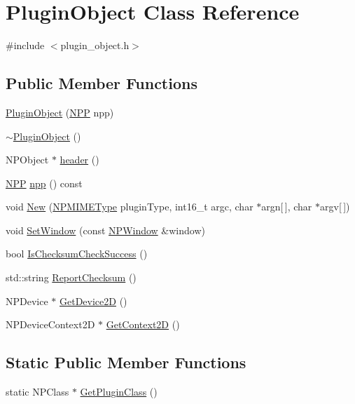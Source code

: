 \hypertarget{class_plugin_object}{
\section{PluginObject Class Reference}
\label{class_plugin_object}
}


{\ttfamily \#include $<$plugin\_\-object.h$>$}

\subsection*{Public Member Functions}
\begin{DoxyCompactItemize}
\item 
\hyperlink{class_plugin_object_ab24118f5b174beacb1b7f652bbbcf78d}{PluginObject} (\hyperlink{struct___n_p_p}{NPP} npp)
\item 
\hyperlink{class_plugin_object_ab2a72410c84a20133db4dec8ca92b277}{$\sim$PluginObject} ()
\item 
NPObject $\ast$ \hyperlink{class_plugin_object_ac551056ed0941b76c4161ba71e4cf449}{header} ()
\item 
\hyperlink{struct___n_p_p}{NPP} \hyperlink{class_plugin_object_a1a051ee92618bae8134b4d273d1d9982}{npp} () const 
\item 
void \hyperlink{class_plugin_object_a5e103c3aefcd2afb642c2414b92311ac}{New} (\hyperlink{npapi_8h_a6ab16d9f607aeb576061783638ae2973}{NPMIMEType} pluginType, int16\_\-t argc, char $\ast$argn\mbox{[}$\,$\mbox{]}, char $\ast$argv\mbox{[}$\,$\mbox{]})
\item 
void \hyperlink{class_plugin_object_a2a2774a67eadffc3f78d60e6c0559cf0}{SetWindow} (const \hyperlink{struct___n_p_window}{NPWindow} \&window)
\item 
bool \hyperlink{class_plugin_object_a4f594d05bd890649ca0f87ce30f03d26}{IsChecksumCheckSuccess} ()
\item 
std::string \hyperlink{class_plugin_object_a0ab936e960c08282554224a4570540aa}{ReportChecksum} ()
\item 
NPDevice $\ast$ \hyperlink{class_plugin_object_a0678b6675237f65d7679a400759b5c29}{GetDevice2D} ()
\item 
NPDeviceContext2D $\ast$ \hyperlink{class_plugin_object_ad121e4145b1f1cdcf878208919859e31}{GetContext2D} ()
\end{DoxyCompactItemize}
\subsection*{Static Public Member Functions}
\begin{DoxyCompactItemize}
\item 
static NPClass $\ast$ \hyperlink{class_plugin_object_a4b017230102036f1626af06df4864a95}{GetPluginClass} ()
\end{DoxyCompactItemize}
